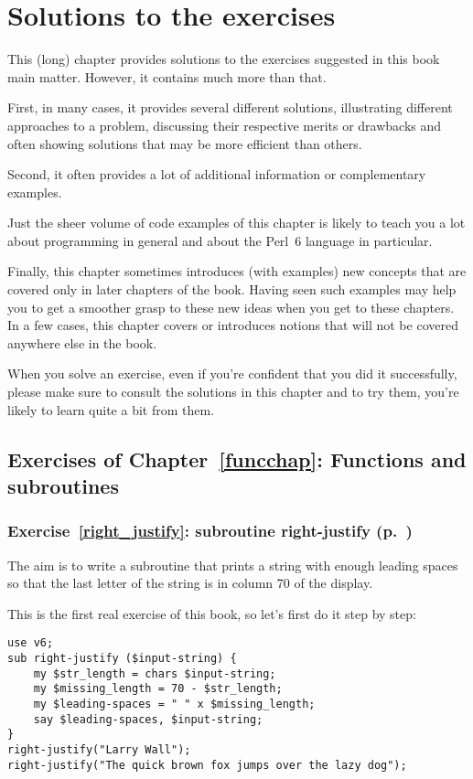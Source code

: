\chapter{Solutions to the exercises}

This (long) chapter provides solutions to the exercises 
suggested in this book main matter. However, it contains 
much more than that.

First, in many cases, it provides several different solutions, 
illustrating different approaches to a problem, discussing 
their respective merits or drawbacks and often 
showing solutions that may be more efficient than others.

Second, it often provides a lot of additional information 
or complementary examples.

Just the sheer volume of code examples of this chapter is 
likely to teach you a lot about programming in general and 
about the Perl~6 language in particular.

Finally, this chapter sometimes introduces (with examples) new 
concepts that are covered only in later chapters of the book. 
Having seen such examples may help you to get a smoother 
grasp to these new ideas when you get to these chapters. 
In a few cases, this chapter covers or introduces notions 
that will not be covered anywhere else in the book.

When you solve an exercise, even if you're confident that you 
did it successfully, please make sure to consult the solutions 
in this chapter and to try them, you're likely to learn quite 
a bit from them.

\section{Exercises of Chapter~\ref{funcchap}: Functions and subroutines}

\subsection{Exercise~\ref{right_justify}: subroutine right-justify (p.~\pageref{right_justify})}
\label{sol_right_justify}

The aim is to write a subroutine that prints a string
with enough leading spaces so that the last letter 
of the string is in column 70 of the display.

This is the first real exercise of this book, so let's first 
do it step by step:

\begin{verbatim}
use v6;
sub right-justify ($input-string) {
    my $str_length = chars $input-string;
    my $missing_length = 70 - $str_length;
    my $leading-spaces = " " x $missing_length;
    say $leading-spaces, $input-string;
}
right-justify("Larry Wall");
right-justify("The quick brown fox jumps over the lazy dog");
\end{verbatim}


